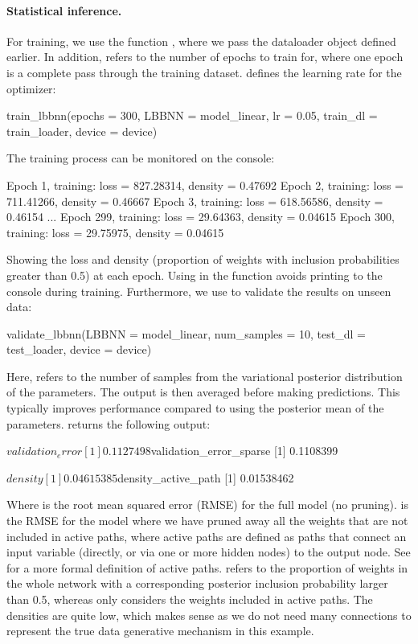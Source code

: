 \paragraph{Statistical inference.} For training, we use the function , where we pass the dataloader object defined earlier. In addition,  refers to the number of epochs to train for, where one epoch is a complete pass through the training dataset.  defines the learning rate for the optimizer:
\begin{example}
train_lbbnn(epochs = 300, LBBNN = model_linear,
            lr = 0.05, train_dl = train_loader, device = device)
\end{example}
The training process can be monitored on the console:
\begin{example}
Epoch 1, training: loss = 827.28314, density = 0.47692 
Epoch 2, training: loss = 711.41266, density = 0.46667 
Epoch 3, training: loss = 618.56586, density = 0.46154 
...
Epoch 299, training: loss = 29.64363, density = 0.04615 
Epoch 300, training: loss = 29.75975, density = 0.04615 
\end{example}
Showing the loss and density (proportion of weights with inclusion probabilities greater than 0.5) at each epoch. Using  in the  function avoids printing to the console during training. Furthermore, we use  to validate the results on unseen data:
\begin{example}
validate_lbbnn(LBBNN = model_linear, num_samples = 10, test_dl = test_loader,
              device = device)
\end{example}
Here,  refers to the number of samples from the variational posterior distribution of the parameters. The output is then averaged before making predictions. This typically improves performance compared to using the posterior mean of the parameters.  returns the following output:
\begin{example}
$validation_error
[1] 0.1127498

$validation_error_sparse
[1] 0.1108399

$density
[1] 0.04615385

$density_active_path
[1] 0.01538462
\end{example}
Where  is the
root mean squared error (RMSE) for the full model (no pruning).  is the RMSE for the model where we have pruned away all the weights that are not included in active paths, where active paths are defined as paths that connect an input variable (directly, or via one or more hidden nodes) to the output node. See \cite{hoyheim2026explainable} for a more formal definition of active paths.  refers to the proportion of weights in the whole network with a corresponding posterior inclusion probability larger than 0.5, whereas  only considers the weights included in active paths. The densities are quite low, which makes sense as we do not need many connections to represent the true data generative mechanism in this example. 


